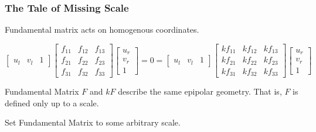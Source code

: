 \begin{frame}
    \frametitle{The Tale of Missing Scale}
    
    Fundamental matrix acts on homogenous coordinates.

    \begin{equation*}
    \begin{bmatrix} u_l & v_l & 1 \end{bmatrix}
    \begin{bmatrix} f_{11} & f_{12} & f_{13} \\ f_{21} & f_{22} & f_{23} \\ f_{31} & f_{32} & f_{33} \end{bmatrix}
    \begin{bmatrix} u_r \\ v_r \\ 1 \end{bmatrix}
    = 0
    =
    \begin{bmatrix} u_l & v_l & 1 \end{bmatrix}
    \begin{bmatrix} kf_{11} & kf_{12} & kf_{13} \\ kf_{21} & kf_{22} & kf_{23} \\ kf_{31} & kf_{32} & kf_{33} \end{bmatrix}
    \begin{bmatrix} u_r \\ v_r \\ 1 \end{bmatrix}
    \end{equation*}

    \vspace{1em} %

    Fundamental Matrix $F$ and $kF$ describe the same epipolar geometry. That is, $F$ is defined only up to a scale.

    \vspace{2em} %

    Set Fundamental Matrix to some arbitrary scale.

    \vspace{0.5em} %

    \begin{center}
    \end{center}
    
\end{frame}

